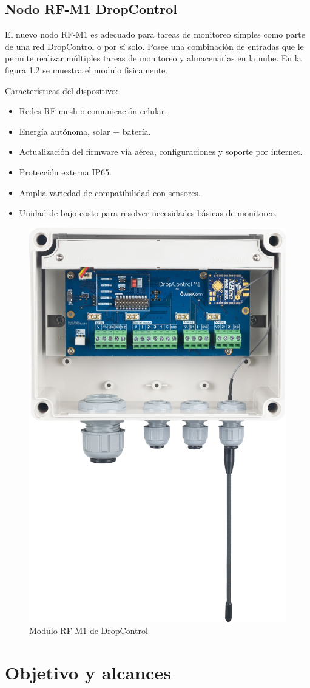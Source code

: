 \vspace{1cm}

\subsection{Nodo RF-M1 DropControl}

El nuevo nodo RF-M1 es adecuado para tareas de monitoreo simples como parte de una red DropControl o por sí solo. Posee una combinación de entradas que le permite realizar múltiples tareas de monitoreo y almacenarlas en la nube. En la figura 1.2 se muestra el modulo fisicamente.

Características del dispositivo: 
\begin{itemize}
  \item Redes RF mesh o comunicación celular.
  \item Energía autónoma, solar + batería.
  \item Actualización del firmware vía aérea, configuraciones y soporte por internet.
  \item Protección externa IP65.
  \item Amplia variedad de compatibilidad con sensores.
  \item Unidad de bajo costo para resolver necesidades básicas de monitoreo. 
\end{itemize}

\begin{figure}[htbp]
	\centering
	\includegraphics[width=.3\textwidth]{./Figures/modulo_dropcontrol.png}
	\caption{Modulo RF-M1 de DropControl}
	\label{fig:texmaker}
\end{figure}

\vspace{1cm}
\vspace{30cm}

\section{Objetivo y alcances}

